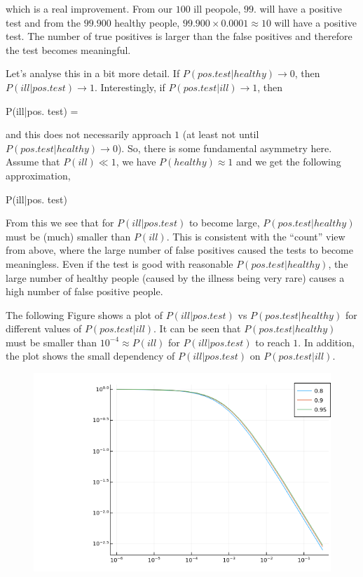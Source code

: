 which is a real improvement. From our $100$ ill peopole, $99.$ will have a positive test and from the $99.900$ healthy people, $99.900 \times 0.0001 \approx 10$ will have a positive test. The number of true positives is larger than the false positives and therefore the test becomes meaningful.

Let's analyse this in a bit more detail. If $P(pos. test | healthy) \rightarrow 0$, then $P(ill|pos. test) \rightarrow 1$. Interestingly, if $P(pos. test | ill) \rightarrow 1$, then

\bee
P(ill|pos. test) = 
\eee

and this does not necessarily approach $1$ (at least not until $P(pos.test|healthy) \rightarrow 0$). So, there is some fundamental asymmetry here. Assume that $P(ill) \ll 1$, we have $P(healthy) \approx 1$ and we get the following approximation,

\bee
P(ill|pos. test) \approx {}
\eee

From this we see that for $P(ill|pos. test)$ to become large, $P(pos.test|healthy)$ must be (much) smaller than $P(ill)$. This is consistent with the ``count'' view from above, where the large number of false positives caused the tests to become meaningless. Even if the test is good with reasonable $P(pos.test|healthy)$, the large number of healthy people (caused by the illness being very rare) causes a high number of false positive people.

The following Figure shows a plot of $P(ill|pos. test)$ vs $P(pos.test|healthy)$ for different values of $P(pos.test|ill)$. It can be seen that $P(pos.test|healthy)$ must be smaller than $10^{-4} \approx P(ill)$ for $P(ill|pos. test)$ to reach $1$. In addition, the plot shows the small dependency of $P(ill|pos. test)$ on $P(pos.test|ill)$.

\begin{figure}[H]
    \centering
    \includegraphics[scale=0.65]{images/bayes_illness_1.png}
\end{figure}


